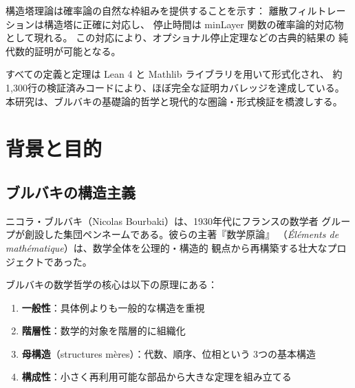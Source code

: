 \documentclass[11pt,a4paper]{article}
\theoremstyle{plain}
\theoremstyle{definition}
\begin{document}
構造塔理論は確率論の自然な枠組みを提供することを示す：
離散フィルトレーションは構造塔に正確に対応し、
停止時間は minLayer 関数の確率論的対応物として現れる。
この対応により、オプショナル停止定理などの古典的結果の
純代数的証明が可能となる。

すべての定義と定理は Lean 4 と Mathlib ライブラリを用いて形式化され、
約1,300行の検証済みコードにより、ほぼ完全な証明カバレッジを達成している。
本研究は、ブルバキの基礎論的哲学と現代的な圏論・形式検証を橋渡しする。

\tableofcontents
\newpage

\section{背景と目的}
\label{sec:background}

\subsection{ブルバキの構造主義}

ニコラ・ブルバキ（Nicolas Bourbaki）は、1930年代にフランスの数学者
グループが創設した集団ペンネームである。彼らの主著『数学原論』
（\textit{Éléments de mathématique}）は、数学全体を公理的・構造的
観点から再構築する壮大なプロジェクトであった。

ブルバキの数学哲学の核心は以下の原理にある：
\begin{enumerate}[label=(\arabic*)]
  \item \textbf{一般性}：具体例よりも一般的な構造を重視
  \item \textbf{階層性}：数学的対象を階層的に組織化
  \item \textbf{母構造}（structures mères）：代数、順序、位相という
        3つの基本構造
  \item \textbf{構成性}：小さく再利用可能な部品から大きな定理を組み立てる
\end{enumerate}
\end{document}
